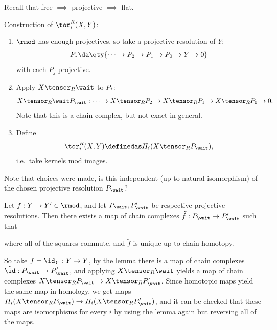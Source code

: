 Recall that free \(\implies\) projective \(\implies\) flat.

Construction of \(\tor_i^R(X, Y)\):

\begin{enumerate}
\def\labelenumi{\arabic{enumi}.}
\item
  \(\rmod\) has enough projectives, so take a projective resolution of
  \(Y\):
  \begin{align*} 
  P_* \da \qty{ \cdots \to P_2 \to P_1 \to P_0 \to Y \to 0 }
  \end{align*} with each \(P_j\) projective.
\item
  Apply \(X\tensor_R \wait\) to \(P_*\):
  \begin{align*}
  X\tensor_R \wait P_\wait: \cdots \to X \tensor_R P_2 \to X\tensor_R P_1 \to X\tensor_R P_0 \to 0
  .\end{align*} Note that this is a chain complex, but not exact in
  general.
\item
  Define
  \begin{align*}
  \tor_i^R(X, Y) \definedas H_i(X\tensor_R P_\wait)
  ,\end{align*} i.e.~take kernels mod images.
\end{enumerate}

Note that choices were made, is this independent (up to natural
isomorphism) of the chosen projective resolution \(P_\wait\)?

\begin{lemma}[?]

Let \(f: Y\to Y' \in \rmod\), and let \(P_\wait, P_\wait'\) be
respective projective resolutions. Then there exists a map of chain
complexes \(\tilde f: P_\wait \to P_\wait'\) such that

\begin{center}\end{center}

where all of the squares commute, and \(\tilde f\) is unique up to chain
homotopy.

\end{lemma}

So take \(f = \id_Y: Y\to Y\), by the lemma there is a map of chain
complexes \(\tilde \id: P_\wait \to P_\wait'\), and applying
\(X\tensor_R \wait\) yields a map of chain complexes
\(X\tensor_R P_\wait \to X\tensor_R P_\wait'\). Since homotopic maps
yield the same map in homology, we get maps
\(H_i(X\tensor_R P_\wait) \to H_i(X\tensor_R P_\wait')\), and it can be
checked that these maps are isomorphisms for every \(i\) by using the
lemma again but reversing all of the maps.

